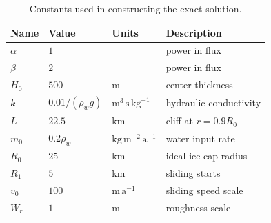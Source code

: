 \documentclass[gmd]{copernicus}   %
\newcommand{\text}{\textrm}
\begin{document}
\begin{table}[ht]
  \centering
  \caption{Constants used in constructing the exact solution.}
  \begin{tabular}{llll}
    \textbf{Name} & \textbf{Value} & \textbf{Units} & \textbf{Description}\\
\hline
    $\alpha$ & $1$ & & power in flux \\
    $\beta$  & $2$ & & power in flux \\
    $H_0$ & $500$ & m & center thickness \\
    $k$   & $0.01/(\rho_w g)$ & $\text{m}^3\,\text{s}\,\text{kg}^{-1}$ & hydraulic conductivity \\
    $L$   & $22.5$& km & cliff at $r=0.9 R_0$ \\
    $m_0$ & $0.2\rho_w$ & $\text{kg}\,\text{m}^{-2}\,\text{a}^{-1}$ & water input rate \\
    $R_0$ & $25$  & km & ideal ice cap radius \\
    $R_1$ & $5$   & km & sliding starts \\
    $v_0$ & $100$ & $\text{m}\,\text{a}^{-1}$ & sliding speed scale \\
    $W_r$ & $1$ & m & roughness scale \\
    \hline
  \end{tabular}
 \label{tab:verifconstants}
\end{table}
\end{document}
